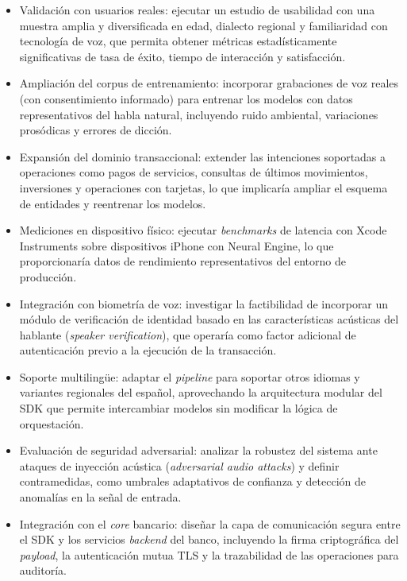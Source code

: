 \begin{itemize}
\item Validación con usuarios reales: ejecutar un estudio de usabilidad con una muestra amplia y diversificada en edad, dialecto regional y familiaridad con tecnología de voz, que permita obtener métricas estadísticamente significativas de tasa de éxito, tiempo de interacción y satisfacción.

\item Ampliación del corpus de entrenamiento: incorporar grabaciones de voz reales (con consentimiento informado) para entrenar los modelos con datos representativos del habla natural, incluyendo ruido ambiental, variaciones prosódicas y errores de dicción.

\item Expansión del dominio transaccional: extender las intenciones soportadas a operaciones como pagos de servicios, consultas de últimos movimientos, inversiones y operaciones con tarjetas, lo que implicaría ampliar el esquema de entidades y reentrenar los modelos.

\item Mediciones en dispositivo físico: ejecutar \textit{benchmarks} de latencia con Xcode Instruments sobre dispositivos iPhone con Neural Engine, lo que proporcionaría datos de rendimiento representativos del entorno de producción.

\item Integración con biometría de voz: investigar la factibilidad de incorporar un módulo de verificación de identidad basado en las características acústicas del hablante (\textit{speaker verification}), que operaría como factor adicional de autenticación previo a la ejecución de la transacción.

\item Soporte multilingüe: adaptar el \textit{pipeline} para soportar otros idiomas y variantes regionales del español, aprovechando la arquitectura modular del SDK que permite intercambiar modelos sin modificar la lógica de orquestación.

\item Evaluación de seguridad adversarial: analizar la robustez del sistema ante ataques de inyección acústica (\textit{adversarial audio attacks}) y definir contramedidas, como umbrales adaptativos de confianza y detección de anomalías en la señal de entrada.

\item Integración con el \textit{core} bancario: diseñar la capa de comunicación segura entre el SDK y los servicios \textit{backend} del banco, incluyendo la firma criptográfica del \textit{payload}, la autenticación mutua TLS y la trazabilidad de las operaciones para auditoría.
\end{itemize}
